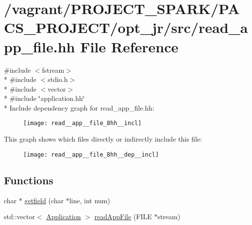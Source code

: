 \hypertarget{read__app__file_8hh}{\section{/vagrant/\-P\-R\-O\-J\-E\-C\-T\-\_\-\-S\-P\-A\-R\-K/\-P\-A\-C\-S\-\_\-\-P\-R\-O\-J\-E\-C\-T/opt\-\_\-jr/src/read\-\_\-app\-\_\-file.hh File Reference}
\label{read__app__file_8hh}
}
{\ttfamily \#include $<$fstream$>$}\\*
{\ttfamily \#include $<$stdio.\-h$>$}\\*
{\ttfamily \#include $<$vector$>$}\\*
{\ttfamily \#include \char`\"{}application.\-hh\char`\"{}}\\*
Include dependency graph for read\-\_\-app\-\_\-file.\-hh\-:\nopagebreak
\begin{figure}[H]
\begin{center}
\leavevmode
\texttt{[image: read\_\_app\_\_file\_8hh\_\_incl]}
\end{center}
\end{figure}
This graph shows which files directly or indirectly include this file\-:\nopagebreak
\begin{figure}[H]
\begin{center}
\leavevmode
\texttt{[image: read\_\_app\_\_file\_8hh\_\_dep\_\_incl]}
\end{center}
\end{figure}
\subsection*{Functions}
\begin{DoxyCompactItemize}
\item 
char $\ast$ \hyperlink{read__app__file_8hh_a28f2319f14673125b080c828eac27d7a}{getfield} (char $\ast$line, int num)
\item 
std\-::vector$<$ \hyperlink{classApplication}{Application} $>$ \hyperlink{read__app__file_8hh_aa73d7abbbef707bf918fbef4c1942cae}{read\-App\-File} (F\-I\-L\-E $\ast$stream)
\end{DoxyCompactItemize}
